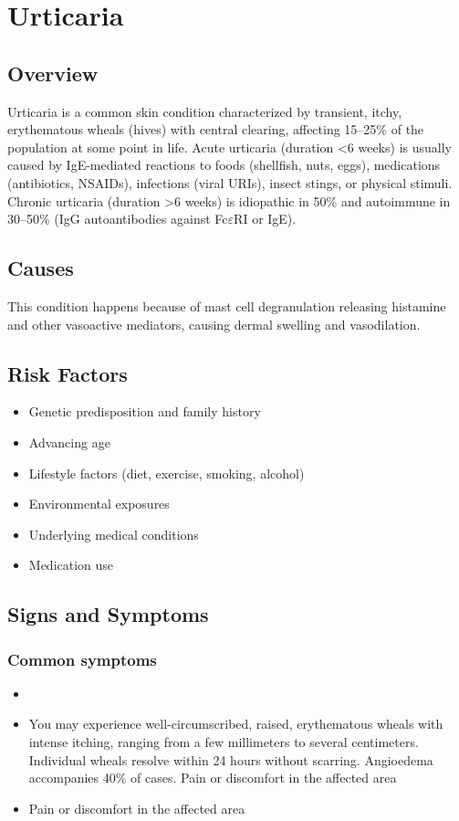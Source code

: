 \chapter{Urticaria}
\label{sec:Urticaria}

\section{Overview}
Urticaria is a common skin condition characterized by transient, itchy, erythematous wheals (hives) with central clearing, affecting 15--25\% of the population at some point in life. Acute urticaria (duration <6 weeks) is usually caused by IgE-mediated reactions to foods (shellfish, nuts, eggs), medications (antibiotics, NSAIDs), infections (viral URIs), insect stings, or physical stimuli. Chronic urticaria (duration >6 weeks) is idiopathic in 50\% and autoimmune in 30--50\% (IgG autoantibodies against Fc$\varepsilon$RI or IgE).
\section{Causes}
This condition happens because of mast cell degranulation releasing histamine and other vasoactive mediators, causing dermal swelling and vasodilation.     
\section{Risk Factors}

\begin{itemize}[noitemsep]
  \item Genetic predisposition and family history
  \item Advancing age
  \item Lifestyle factors (diet, exercise, smoking, alcohol)
  \item Environmental exposures
  \item Underlying medical conditions
  \item Medication use
\end{itemize}
\section{Signs and Symptoms}

\subsection{Common symptoms}
\begin{itemize}[noitemsep]
  \item \item You may experience well-circumscribed, raised, erythematous wheals with intense itching, ranging from a few millimeters to several centimeters. Individual wheals resolve within 24 hours without scarring. Angioedema accompanies 40\% of cases. Pain or discomfort in the affected area    \item Pain or discomfort in the affected area
  \end{itemize}

